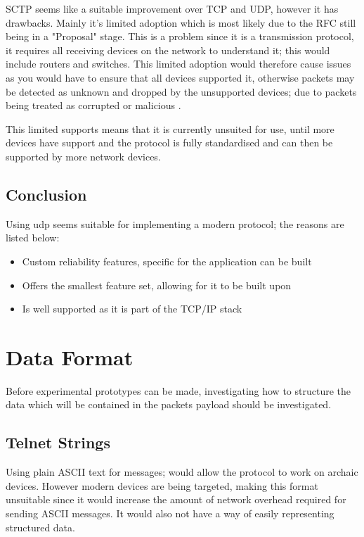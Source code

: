 SCTP seems like a suitable improvement over TCP and UDP, however it has drawbacks. Mainly it's limited adoption which is most likely due to the RFC still being in a "Proposal" stage. This is a problem since it is a transmission protocol, it requires all receiving devices on the network to understand it; this would include routers and switches. This limited adoption would therefore cause issues as you would have to ensure that all devices supported it, otherwise packets may be detected as unknown and dropped by the unsupported devices; due to packets being treated as corrupted or malicious \parencite{stewart2001sctp}.

This limited supports means that it is currently unsuited for use, until more devices have support and the protocol is fully standardised and can then be supported by more network devices.

\subsection*{Conclusion}
Using \acrshort{udp} seems suitable for implementing a modern protocol; the reasons are listed below:

\begin{itemize}
    \item Custom reliability features, specific for the application can be built
    \item Offers the smallest feature set, allowing for it to be built upon
    \item Is well supported as it is part of the TCP/IP stack
\end{itemize}


\section{Data Format}
Before experimental prototypes can be made, investigating how to structure the data which will be contained in the packets payload should be investigated.

\subsection*{Telnet Strings}
Using plain ASCII text for messages; would allow the protocol to work on archaic devices. However modern devices are being targeted, making this format unsuitable since it would increase the amount of network overhead required for sending ASCII messages. It would also not have a way of easily representing structured data.

